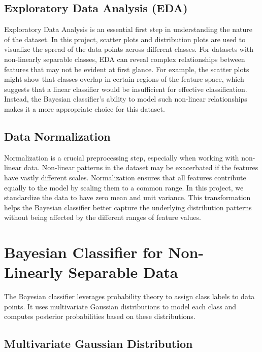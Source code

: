 \documentclass[conference]{IEEEtran}
\begin{document}
\subsection{Exploratory Data Analysis (EDA)}

Exploratory Data Analysis is an essential first step in understanding the nature of the dataset. In this project, scatter plots and distribution plots are used to visualize the spread of the data points across different classes. For datasets with non-linearly separable classes, EDA can reveal complex relationships between features that may not be evident at first glance. For example, the scatter plots might show that classes overlap in certain regions of the feature space, which suggests that a linear classifier would be insufficient for effective classification. Instead, the Bayesian classifier's ability to model such non-linear relationships makes it a more appropriate choice for this dataset.

\subsection{Data Normalization}

Normalization is a crucial preprocessing step, especially when working with non-linear data. Non-linear patterns in the dataset may be exacerbated if the features have vastly different scales. Normalization ensures that all features contribute equally to the model by scaling them to a common range. In this project, we standardize the data to have zero mean and unit variance. This transformation helps the Bayesian classifier better capture the underlying distribution patterns without being affected by the different ranges of feature values.

\section{Bayesian Classifier for Non-Linearly Separable Data}

The Bayesian classifier leverages probability theory to assign class labels to data points. It uses multivariate Gaussian distributions to model each class and computes posterior probabilities based on these distributions.

\subsection{Multivariate Gaussian Distribution}
\end{document}

